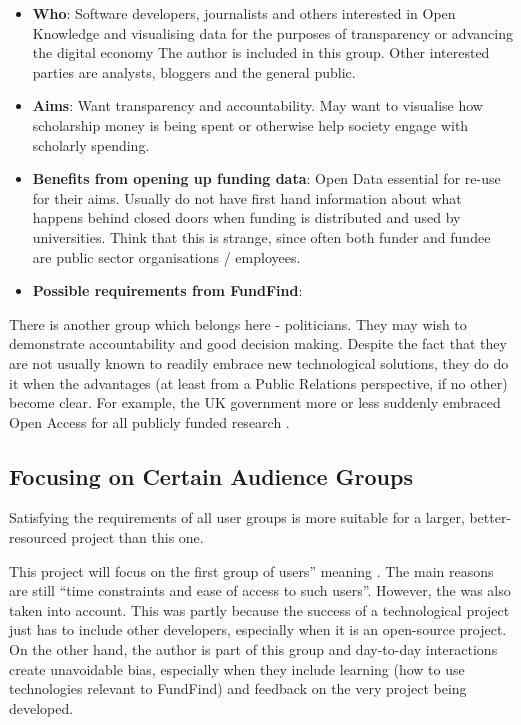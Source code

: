 \begin{itemize}
 \item \textbf{Who}: Software developers, journalists and others interested in Open Knowledge and visualising data for the purposes of transparency or advancing the digital economy \cite{okfn-vision} The author is included in this group. Other interested parties are analysts, bloggers and the general public.
 \item \textbf{Aims}: Want transparency and accountability. May want to visualise how scholarship money is being spent or otherwise help society engage with scholarly spending.
 \item \textbf{Benefits from opening up funding data}: Open Data essential for re-use for their aims. Usually do not have first hand information about what happens behind closed doors when funding is distributed and used by universities. Think that this is strange, since often both funder and fundee are public sector organisations / employees.
 \item \textbf{Possible requirements from FundFind}: 
\end{itemize}

There is another group which belongs here - politicians. They may wish to demonstrate accountability and good decision making. Despite the fact that they are not usually known to readily embrace new technological solutions, they do do it when the advantages (at least from a Public Relations perspective, if no other) become clear. For example, the UK government more or less suddenly embraced Open Access for all publicly funded research \cite{guardian-ukgov-oa2014}.

\subsection{Focusing on Certain Audience Groups}
\label{focus-groups}
Satisfying the requirements of all user groups is more suitable for a larger, better-resourced project than this one.

This project will focus on the first group of users'' meaning . The main reasons are still ``time constraints and ease of access to such users''. However, the  was also taken into account. This was partly because the success of a technological project just has to include other developers, especially when it is an open-source project. On the other hand, the author is part of this group and day-to-day interactions create unavoidable bias, especially when they include learning (how to use technologies relevant to FundFind) and feedback on the very project being developed.

